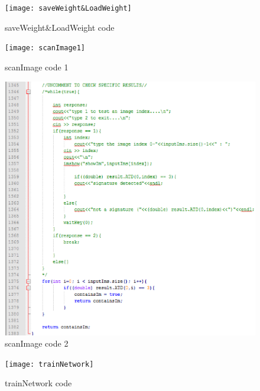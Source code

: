 \documentclass[article, onecolumn, draftclsnofoot,10pt, compsoc]{IEEEtran}
\begin{document}
\begin{figure}
  \caption{saveWeight\&LoadWeight code}
  \centering
  \texttt{[image: saveWeight\&LoadWeight]}
\end{figure}
\begin{figure}
  \caption{scanImage code 1}
  \centering
  \texttt{[image: scanImage1]}
\end{figure}
\begin{figure}
  \caption{scanImage code 2}
  \centering
  \includegraphics[width=\textwidth]{scanImage2}
\end{figure}
\begin{figure}
  \caption{trainNetwork code }
  \centering
  \texttt{[image: trainNetwork]}
\end{figure}
\end{document}
